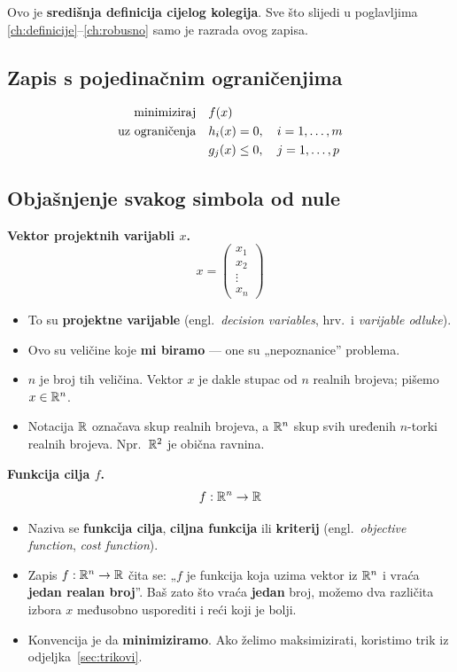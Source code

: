 Ovo je \textbf{središnja definicija cijelog kolegija}. Sve što slijedi u
poglavljima \ref{ch:definicije}--\ref{ch:robusno} samo je razrada ovog zapisa.

\subsection{Zapis s pojedinačnim ograničenjima}

\begin{definicija}
\begin{equation}
\begin{aligned}
\minim & f(x) \\
\uzogr & h_i(x) = 0, \quad i = 1,\dots,m \\
       & g_j(x) \le 0, \quad j = 1,\dots,p
\end{aligned}
\end{equation}
\end{definicija}

\subsection{Objašnjenje svakog simbola od nule}

\textbf{Vektor projektnih varijabli $x$.}
\[
x = \begin{pmatrix} x_1 \\ x_2 \\ \vdots \\ x_n \end{pmatrix}
\]

\begin{itemize}
  \item To su \textbf{projektne varijable} (engl.\ \emph{decision variables},
        hrv.\ i \emph{varijable odluke}).
  \item Ovo su veličine koje \textbf{mi biramo} --- one su „nepoznanice”
        problema.
  \item $n$ je broj tih veličina. Vektor $x$ je dakle stupac od $n$ realnih
        brojeva; pišemo $x \in \R^n$.
  \item Notacija $\R$ označava skup realnih brojeva, a $\R^n$ skup svih
        uređenih $n$-torki realnih brojeva. Npr.\ $\R^2$ je obična ravnina.
\end{itemize}

\textbf{Funkcija cilja $f$.}
\[
f : \R^n \to \R
\]

\begin{itemize}
  \item Naziva se \textbf{funkcija cilja}, \textbf{ciljna funkcija} ili
        \textbf{kriterij} (engl.\ \emph{objective function}, \emph{cost
        function}).
  \item Zapis $f : \R^n \to \R$ čita se: „$f$ je funkcija koja uzima vektor iz
        $\R^n$ i vraća \textbf{jedan realan broj}”. Baš zato što vraća
        \textbf{jedan} broj, možemo dva različita izbora $x$ međusobno
        usporediti i reći koji je bolji.
  \item Konvencija je da \textbf{minimiziramo}. Ako želimo maksimizirati,
        koristimo trik iz odjeljka~\ref{sec:trikovi}.
\end{itemize}

